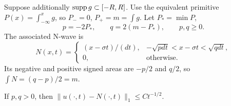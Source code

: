 Suppose additionally $\operatorname{supp} g\subset[-R,R]$.
Use the equivalent primitive $P(x)=\int_{-\infty}^xg$,
so $P_-=0$, $P_+=m=\int g$.
Let $P_*=\min P$,
\[
 p=-2P_*,\qquad q=2(m-P_*),\qquad p,q\geq0.
\]
The associated N-wave is
\[
 N(x,t)=\begin{cases}
 (x-\sigma t)/(dt),
   &-\sqrt{pdt}<x-\sigma t<\sqrt{qdt},\\
 0,&\text{otherwise}.
 \end{cases}
 \tag{NW}
\]
Its negative and positive signed areas are $-p/2$ and $q/2$,
so $\int N=(q-p)/2=m$.
\Needspace{45mm}
\begin{theorem}
If $p,q>0$, then $\|u(\cdot,t)-N(\cdot,t)\|_1\leq C t^{-1/2}$.
\end{theorem}
